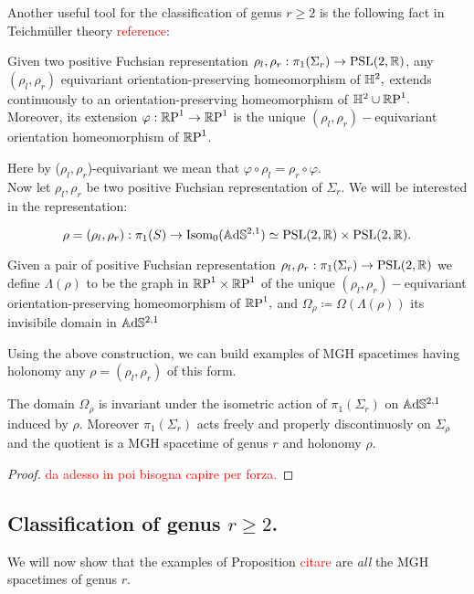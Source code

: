 Another useful tool for the classification of genus $r\geq 2$ is the following fact in Teichm\"uller theory \textcolor{red}{reference}:

\begin{lemma}
    Given two positive Fuchsian representation $\rho_l,\rho_r:\pi_1(\Sigma_r)\to\text{PSL}(2,\mathbb{R})$, any $(\rho_l,\rho_r)$ equivariant orientation-preserving homeomorphism of $\mathbb{H}^2,$ extends continuously to an orientation-preserving homeomorphism of $\mathbb{H}^2\cup\mathbb{R}\text{P}^1.$ Moreover, its extension $\varphi:\mathbb{R}\text{P}^1\to\mathbb{R}\text{P}^1$ is the unique $(\rho_l,\rho_r)-$equivariant orientation homeomorphism of $\mathbb{R}\text{P}^1$.     
\end{lemma}

Here by ($\rho_l,\rho_r$)-equivariant we mean that $\varphi\circ\rho_l=\rho_r\circ\varphi.$\\
Now let $\rho_l,\rho_r$ be two positive Fuchsian representation of $\Sigma_r.$ We will be interested in the representation:

\[
    \rho=(\rho_l,\rho_r):\pi_1(S)\to\text{Isom}_0(\mathbb{A}\mathrm{d}\mathbb{S}^{2,1})\simeq \text{PSL}(2,\mathbb{R})\times\text{PSL}(2,\mathbb{R}).
\]

\begin{definition}
    Given a pair of positive Fuchsian representation $\rho_l,\rho_r:\pi_1(\Sigma_r)\to\text{PSL}(2,\mathbb{R})$ we define $\Lambda(\rho)$ to be the graph in $\mathbb{R}\text{P}^1\times\mathbb{R}\text{P}^1$ of the unique $(\rho_l,\rho_r)-$equivariant orientation-preserving homeomorphism of $\mathbb{R}\text{P}^1,$ and $\Omega_\rho \coloneqq \Omega(\Lambda(\rho))$ its invisibile domain in $\mathbb{A}\mathrm{d}\mathbb{S}^{2,1}$
\end{definition}

Using the above construction, we can build examples of MGH spacetimes having holonomy any $\rho=(\rho_l,\rho_r)$ of this form. 

\begin{proposition}
    The domain $\Omega_\rho$ is invariant under the isometric action of $\pi_1(\Sigma_r)$ on $\mathbb{A}\mathrm{d}\mathbb{S}^{2,1}$ induced by $\rho.$ Moreover $\pi_1(\Sigma_r)$ acts freely and properly discontinuosly on $\Sigma_\rho$ and the quotient is a MGH spacetime of genus $r$ and holonomy $\rho.$ 
\end{proposition}
\begin{proof}
    \textcolor{red}{da adesso in poi bisogna capire per forza.}
\end{proof}

\subsection{Classification of genus $r\geq 2$.} We will now show that the examples of Proposition \textcolor{red}{citare} are \textit{all} the MGH spacetimes of genus $r$. 


